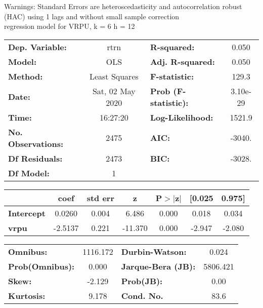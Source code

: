 Warnings: \newline
 [1] Standard Errors are heteroscedasticity and autocorrelation robust (HAC) using 1 lags and without small sample correction\\ 

regression model for VRPU, k = 6 h = 12\begin{center}
\begin{tabular}{lclc}
\toprule
\textbf{Dep. Variable:}    &       rtrn       & \textbf{  R-squared:         } &     0.050   \\
\textbf{Model:}            &       OLS        & \textbf{  Adj. R-squared:    } &     0.050   \\
\textbf{Method:}           &  Least Squares   & \textbf{  F-statistic:       } &     129.3   \\
\textbf{Date:}             & Sat, 02 May 2020 & \textbf{  Prob (F-statistic):} &  3.10e-29   \\
\textbf{Time:}             &     16:27:20     & \textbf{  Log-Likelihood:    } &    1521.9   \\
\textbf{No. Observations:} &        2475      & \textbf{  AIC:               } &    -3040.   \\
\textbf{Df Residuals:}     &        2473      & \textbf{  BIC:               } &    -3028.   \\
\textbf{Df Model:}         &           1      & \textbf{                     } &             \\
\bottomrule
\end{tabular}
\begin{tabular}{lcccccc}
                   & \textbf{coef} & \textbf{std err} & \textbf{z} & \textbf{P$> |$z$|$} & \textbf{[0.025} & \textbf{0.975]}  \\
\midrule
\textbf{Intercept} &       0.0260  &        0.004     &     6.486  &         0.000        &        0.018    &        0.034     \\
\textbf{vrpu}      &      -2.5137  &        0.221     &   -11.370  &         0.000        &       -2.947    &       -2.080     \\
\bottomrule
\end{tabular}
\begin{tabular}{lclc}
\textbf{Omnibus:}       & 1116.172 & \textbf{  Durbin-Watson:     } &    0.024  \\
\textbf{Prob(Omnibus):} &   0.000  & \textbf{  Jarque-Bera (JB):  } & 5806.421  \\
\textbf{Skew:}          &  -2.129  & \textbf{  Prob(JB):          } &     0.00  \\
\textbf{Kurtosis:}      &   9.178  & \textbf{  Cond. No.          } &     83.6  \\
\bottomrule
\end{tabular}
\end{center}

